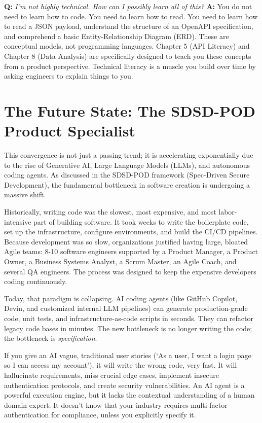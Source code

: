 \textbf{Q:} \emph{I'm not highly technical. How can I possibly learn all
of this?} \textbf{A:} You do not need to learn how to code. You need to
learn how to read. You need to learn how to read a JSON payload,
understand the structure of an OpenAPI specification, and comprehend a
basic Entity-Relationship Diagram (ERD). These are conceptual models,
not programming languages. Chapter 5 (API Literacy) and Chapter 8 (Data
Analysis) are specifically designed to teach you these concepts from a
product perspective. Technical literacy is a muscle you build over time
by asking engineers to explain things to you.

\section{The Future State: The SDSD-POD Product
Specialist}\label{the-future-state-the-sdsd-pod-product-specialist}

This convergence is not just a passing trend; it is accelerating
exponentially due to the rise of Generative AI, Large Language Models
(LLMs), and autonomous coding agents. As discussed in the SDSD-POD
framework (Spec-Driven Secure Development), the fundamental bottleneck
in software creation is undergoing a massive shift.

Historically, writing code was the slowest, most expensive, and most
labor-intensive part of building software. It took weeks to write the
boilerplate code, set up the infrastructure, configure environments, and
build the CI/CD pipelines. Because development was so slow,
organizations justified having large, bloated Agile teams: 8-10 software
engineers supported by a Product Manager, a Product Owner, a Business
Systems Analyst, a Scrum Master, an Agile Coach, and several QA
engineers. The process was designed to keep the expensive developers
coding continuously.

Today, that paradigm is collapsing. AI coding agents (like GitHub
Copilot, Devin, and customized internal LLM pipelines) can generate
production-grade code, unit tests, and infrastructure-as-code scripts in
seconds. They can refactor legacy code bases in minutes. The new
bottleneck is no longer writing the code; the bottleneck is
\emph{specification}.

If you give an AI vague, traditional user stories (`As a user, I want a
login page so I can access my account'), it will write the wrong code,
very fast. It will hallucinate requirements, miss crucial edge cases,
implement insecure authentication protocols, and create security
vulnerabilities. An AI agent is a powerful execution engine, but it
lacks the contextual understanding of a human domain expert. It doesn't
know that your industry requires multi-factor authentication for
compliance, unless you explicitly specify it.

